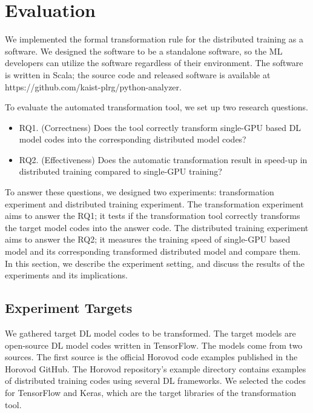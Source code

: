 \section{Evaluation}\label{sec:eval}

We implemented the formal transformation rule for the distributed training
as a software. We designed the software to be a standalone software, so 
the ML developers can utilize the software regardless of their environment. 
The software is written in Scala; the source code and released software
is available at https://github.com/kaist-plrg/python-analyzer.

To evaluate the automated transformation tool, we set up two research
questions.

\begin{itemize}
\item RQ1. (Correctness) Does the tool correctly transform single-GPU based DL model codes into
the corresponding distributed model codes?

\item RQ2. (Effectiveness) Does the automatic transformation result in speed-up 
in distributed training compared to single-GPU training?
\end{itemize}

To answer these questions,  
we designed two experiments: transformation experiment and
distributed training experiment.
The transformation experiment aims to answer the RQ1; it tests if the
transformation tool correctly transforms the target model codes into
the answer code.
The distributed training experiment aims to answer the RQ2;
it measures the training speed of single-GPU based model and its
corresponding transformed distributed model and compare them.
In this section, we describe the experiment setting,
and discuss the results of the experiments and its implications.

\subsection{Experiment Targets}

We gathered target DL model codes to be transformed.
The target models are open-source DL model codes written in TensorFlow.
The models come from two sources. The first source is the official
Horovod code examples published in the Horovod GitHub\cite{horovodgithub}. 
The Horovod repository's example directory contains examples of
distributed training codes using several DL frameworks.  
We selected the codes for TensorFlow and Keras,
which are the target libraries of the transformation tool.

